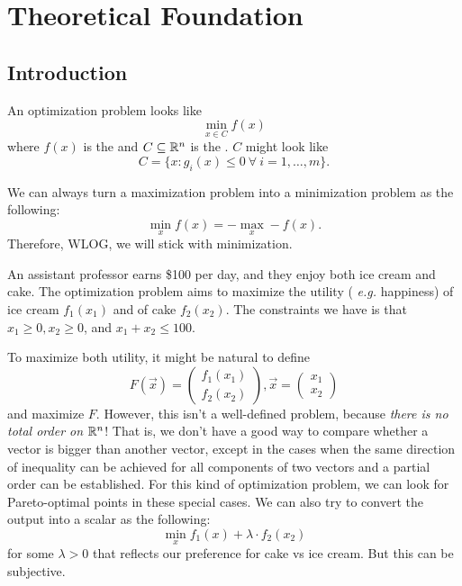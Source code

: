 \documentclass[class=article,crop=false]{standalone}
\begin{document}
\chapter{Theoretical Foundation}
\newpage
\section{Introduction}
An optimization problem looks like
\[
	\min_{x \in C} f(x)
\]
where $ f(x)$ is the   and $ C \subseteq \mathbb{R}^n$ is the . $ C$ might look like
 \[
	 C=\{x: g_i(x) \leq 0 \ \forall \ i=1,\ldots,m\} 
.\] 

\begin{remark}
We can always turn a maximization problem into a minimization problem as the following:
\[
	\min_x f(x) = -\max_x -f(x)
.\] 
Therefore, WLOG, we will stick with minimization.

\end{remark}
	
\begin{eg}
	An assistant professor earns \$100 per day, and they enjoy both ice cream and cake. The optimization problem aims to maximize the utility ( \emph{e.g.} happiness) of ice cream $ f_1(x_1)$ and of cake $ f_2(x_2)$. The constraints we have is that $ x_1\geq 0, x_2 \geq 0$, and $ x_1+x_2 \leq 100$.

	To maximize both utility, it might be natural to define
	\[
		F(\vec{x}) = \begin{pmatrix} f_1(x_1)\\f_2(x_2) \end{pmatrix}, \vec{ x} = \begin{pmatrix} x_1\\x_2 \end{pmatrix}  
	\]
and maximize $ F$. However, this isn't a well-defined problem, because  \emph{there is no total order on $ \mathbb{R}^n$}! That is, we don't have a good way to compare whether a vector is bigger than another vector, except in the cases when the same direction of inequality can be achieved for all components of two vectors and a partial order can be established. For this kind of  optimization problem, we can look for Pareto-optimal points in these special cases. We can also try to convert the output into a scalar as the following:
\[
	\min_x f_1(x) + \lambda \cdot  f_2(x_2)
\]
for some $ \lambda>0$ that reflects our preference for cake vs ice cream. But this can be subjective.

\end{eg}
\end{document}
